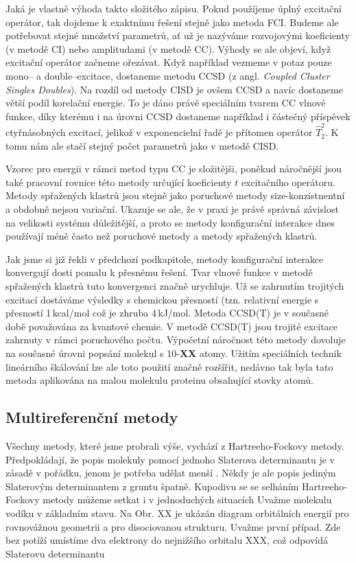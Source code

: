 Jaká je vlastně výhoda takto složitého zápisu.
Pokud použíjeme úplný excitační operátor, tak dojdeme k exaktnímu řešení stejně jako metoda FCI. Budeme ale potřebovat stejné množství parametrů, ať už je nazýváme rozvojovými koeficienty (v metodě CI) nebo amplitudami (v metodě CC).
Výhody se ale objeví, když excitační operátor začneme ořezávat. Když například vezmeme v potaz pouze mono-- a double--excitace, dostaneme metodu CCSD  (z angl. \textit{Coupled Cluster Singles Doubles}).
Na rozdíl od metody CISD je ovšem CCSD  a navíc dostaneme větší podíl korelační energie.
To je dáno právě speciálním tvarem CC vlnové funkce, díky kterému i na úrovni CCSD dostaneme například i částečný příspěvek ctyřnásobných excitací, jelikož v exponencielní řadě je přítomen operátor $\hat{T}_2^2$. K tomu nám ale stačí stejný počet parametrů jako v metodě CISD.

Vzorec pro energii v rámci metod typu CC je složitějši, poněkud náročnější jsou také pracovní rovnice této metody určující koeficienty $t$ excitačního operátoru. Metody spřažených klastrů jsou stejně jako poruchové metody size-konzistnentní a obdobně nejsou variační. Ukazuje se ale, že v praxi je právě správná závislost na velikosti systému důležitější, a proto se metody konfigurační interakce dnes používají méně často než poruchové metody a metody spřažených klastrů.

Jak jsme si již řekli v předchozí podkapitole, metody konfigurační interakce konvergují dosti pomalu k přesnému řešení. Tvar vlnové funkce v metodě spřažených klastrů tuto konvergenci značně urychluje. Už se zahrnutím trojitých excitací dostáváme výsledky s chemickou přesností (tzn. relativní energie s přesností 1\,kcal/mol což je zhruba 4\,kJ/mol.
Metoda CCSD(T) je v současné době považována za  kvantové chemie. V metodě CCSD(T) jsou trojité excitace zahrnuty v rámci poruchového počtu. Výpočetní náročnost této metody dovoluje na současné úrovni popsání molekul s 10-\textbf{XX} atomy. Užitím speciálních technik lineárního škálování lze ale toto použití značně rozšířit, nedávno tak byla tato metoda aplikována na malou molekulu proteinu obsahující stovky atomů. 

\subsection{Multireferenční metody}

Všechny metody, které jsme probrali výše, vychází z Hartreeho-Fockovy metody. Předpokládají, že popis molekuly pomocí jednoho Slaterova determinantu je v zásadě v pořádku, jenom je potřeba udělat menší . Někdy je ale popis jediným Slaterovým determinantem z gruntu špatně. Kupodivu se se selháním Hartreeho-Fockovy metody můžeme setkat i v jednoduchých situacích Uvažme molekulu vodíku v základním stavu. Na Obr. XX je ukázán diagram orbitálních energií pro rovnovážnou geometrii a pro disociovanou strukturu. Uvažme první případ. Zde bez potíží umístíme dva elektrony do nejnižšího orbitalu XXX, což odpovídá Slaterovu determinantu

